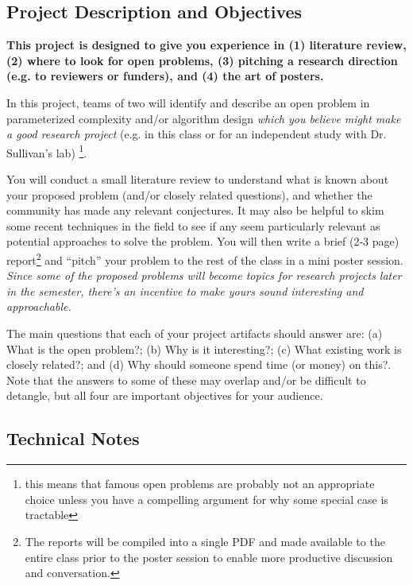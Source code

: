 \documentclass{article}
\begin{document}
\subsection*{Project Description and Objectives}

\textbf{This project is designed to give you experience in (1) literature review,
(2) where to look for open problems, (3) pitching a research direction (e.g. to
reviewers or funders), and (4) the art of posters.}

\vspace{0.25in}

In this project, teams of two will identify and describe an open problem
in parameterized complexity and/or algorithm design
\emph{which you believe might make a good research project} (e.g.
in this class or for an independent study with Dr. Sullivan's lab)
\footnote{this means that famous open problems are probably not an appropriate choice
unless you have a compelling argument for why some special case is tractable}.

\vspace{0.25in}

You will conduct a small literature review to understand what is known about your
proposed problem (and/or closely related questions), and whether the community has
made any relevant conjectures. It may also be helpful to skim some recent techniques
in the field to see if any seem particularly relevant as potential approaches to solve
the problem. You will then write a brief (2-3 page) report\footnote{The reports will be compiled into a single PDF and made available to the entire class prior to the poster
session to enable more productive discussion and conversation.} and ``pitch'' your problem
to the rest of the class in a mini poster session. \emph{Since some of the proposed problems
will become topics for research projects later in the semester, there's an
incentive to make yours sound interesting and approachable.}

\vspace{0.25in}

The main questions that each of your project artifacts should answer are:
(a) What is the open problem?; (b) Why is it interesting?; (c)
What existing work is closely related?; and (d) Why should someone spend time (or money) on this?.
Note that the answers to some of these may overlap and/or be difficult to detangle,
but all four are important objectives for your audience.

\subsection*{Technical Notes}
\end{document}
